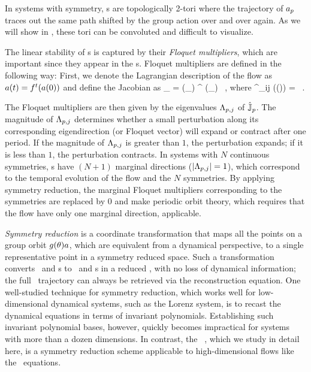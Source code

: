 In systems with  symmetry, \rpo s are
topologically 2-tori where the trajectory of $a_{p}$ traces out the
same path shifted by the group action over and over again. As we will
show in , these tori can be convoluted and
difficult to visualize.

The linear stability of \rpo s is captured by their \emph{Floquet multipliers},
which are important since they appear in the \cycForm s. Floquet multipliers are
defined in the following way: First, we denote the Lagrangian description of the flow as
$a(t) = {f^{t}(a(0))}$ and define the Jacobian as
\beq
\jMpsRed_{\rpprime} = \LieEl (\theta_\rpprime ) \jMps^\period{\rpprime} (\ssp_\rpprime)
\, , \mbox{where}\quad
\jMps^{\zeit}_{ij} (\ssp(\zeit)) = \, .

The Floquet multipliers are then given by the eigenvalues $\Lambda_{p,j}$ of $\hat{\mathbb{J}}_{p}$.
The magnitude of $\Lambda_{p,j}$ determines whether a small perturbation along its corresponding
eigendirection (or Floquet vector) will expand or contract after one period. If the magnitude of
$\Lambda_{p,j}$ is greater than $1$, the perturbation expands; if it is less than $1$, the perturbation
contracts. In systems with $N$ continuous symmetries, \rpo s  have $(N+1)$ marginal directions ($\left|\Lambda_{p,j}\right| = 1$),
which correspond to the temporal evolution of the flow and the $N$ symmetries. By applying symmetry reduction,
the marginal Floquet multipliers corresponding to the symmetries are replaced by $0$ and make periodic orbit
theory, which requires that the flow have only one marginal direction, applicable.

\emph{Symmetry reduction} is a coordinate transformation that maps
all the points on a group orbit $g (\theta) a$, which are
equivalent from a dynamical perspective, to a single representative point in a symmetry reduced space.
Such a transformation converts \reqva\ and \rpo s to \eqva\ and \po s in a
reduced \statesp, with no loss of dynamical information; the full \statesp\
trajectory can always be retrieved via the reconstruction equation. One well-studied
technique for symmetry reduction, which works well for low-dimensional
dynamical systems, such as the Lorenz system,
is to recast the dynamical equations in terms of invariant polynomials.
Establishing such invariant polynomial bases, however, quickly becomes
impractical for systems with more than a dozen dimensions. In contrast,
the \mslices\ ,
which we study in detail here, is a symmetry reduction scheme applicable to
high-dimensional flows like the \NS\ equations\rf{WiShCv14}.

